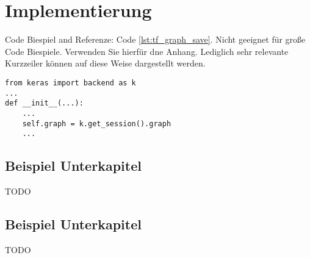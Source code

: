 \chapter{Implementierung}
\label{cha:implmentation}
Code Biespiel and Referenze: Code \ref{lst:tf_graph_save}. Nicht geeignet für große Code Biespiele. Verwenden Sie hierfür dne Anhang. Lediglich sehr relevante Kurzzeiler können auf diese Weise dargestellt werden. 
\begin{lstlisting}[caption={Klasse Agent - Tensorflow Graph}, captionpos=b, label={lst:tf_graph_save}]
from keras import backend as k
...
def __init__(...):
	...
	self.graph = k.get_session().graph
	...
\end{lstlisting}

\section{Beispiel Unterkapitel}
TODO

\section{Beispiel Unterkapitel}
TODO